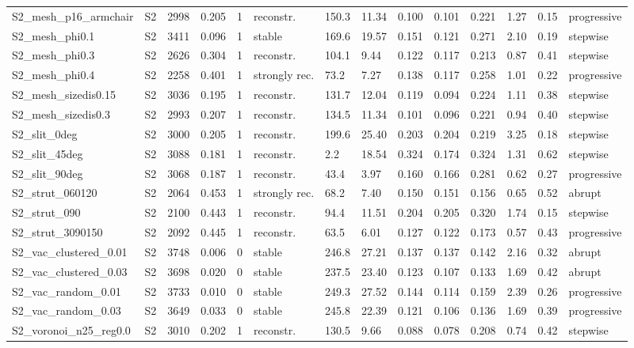 \begin{landscape}
\begin{longtable}{llllllllllllll}
S2\_mesh\_p16\_armchair & S2 & 2998 & 0.205 & 1 & reconstr. & 150.3 & 11.34 & 0.100 & 0.101 & 0.221 & 1.27 & 0.15 & progressive\\
S2\_mesh\_phi0.1 & S2 & 3411 & 0.096 & 1 & stable & 169.6 & 19.57 & 0.151 & 0.121 & 0.271 & 2.10 & 0.19 & stepwise\\
S2\_mesh\_phi0.3 & S2 & 2626 & 0.304 & 1 & reconstr. & 104.1 & 9.44 & 0.122 & 0.117 & 0.213 & 0.87 & 0.41 & stepwise\\
S2\_mesh\_phi0.4 & S2 & 2258 & 0.401 & 1 & strongly rec. & 73.2 & 7.27 & 0.138 & 0.117 & 0.258 & 1.01 & 0.22 & progressive\\
S2\_mesh\_sizedis0.15 & S2 & 3036 & 0.195 & 1 & reconstr. & 131.7 & 12.04 & 0.119 & 0.094 & 0.224 & 1.11 & 0.38 & stepwise\\
S2\_mesh\_sizedis0.3 & S2 & 2993 & 0.207 & 1 & reconstr. & 134.5 & 11.34 & 0.101 & 0.096 & 0.221 & 0.94 & 0.40 & stepwise\\
S2\_slit\_0deg & S2 & 3000 & 0.205 & 1 & reconstr. & 199.6 & 25.40 & 0.203 & 0.204 & 0.219 & 3.25 & 0.18 & stepwise\\
S2\_slit\_45deg & S2 & 3088 & 0.181 & 1 & reconstr. & 2.2 & 18.54 & 0.324 & 0.174 & 0.324 & 1.31 & 0.62 & stepwise\\
S2\_slit\_90deg & S2 & 3068 & 0.187 & 1 & reconstr. & 43.4 & 3.97 & 0.160 & 0.166 & 0.281 & 0.62 & 0.27 & progressive\\
S2\_strut\_060120 & S2 & 2064 & 0.453 & 1 & strongly rec. & 68.2 & 7.40 & 0.150 & 0.151 & 0.156 & 0.65 & 0.52 & abrupt\\
S2\_strut\_090 & S2 & 2100 & 0.443 & 1 & reconstr. & 94.4 & 11.51 & 0.204 & 0.205 & 0.320 & 1.74 & 0.15 & stepwise\\
S2\_strut\_3090150 & S2 & 2092 & 0.445 & 1 & reconstr. & 63.5 & 6.01 & 0.127 & 0.122 & 0.173 & 0.57 & 0.43 & progressive\\
S2\_vac\_clustered\_0.01 & S2 & 3748 & 0.006 & 0 & stable & 246.8 & 27.21 & 0.137 & 0.137 & 0.142 & 2.16 & 0.32 & abrupt\\
S2\_vac\_clustered\_0.03 & S2 & 3698 & 0.020 & 0 & stable & 237.5 & 23.40 & 0.123 & 0.107 & 0.133 & 1.69 & 0.42 & abrupt\\
S2\_vac\_random\_0.01 & S2 & 3733 & 0.010 & 0 & stable & 249.3 & 27.52 & 0.144 & 0.114 & 0.159 & 2.39 & 0.26 & progressive\\
S2\_vac\_random\_0.03 & S2 & 3649 & 0.033 & 0 & stable & 245.8 & 22.39 & 0.121 & 0.106 & 0.136 & 1.69 & 0.39 & progressive\\
S2\_voronoi\_n25\_reg0.0 & S2 & 3010 & 0.202 & 1 & reconstr. & 130.5 & 9.66 & 0.088 & 0.078 & 0.208 & 0.74 & 0.42 & stepwise\\

\end{longtable}
\end{landscape}
